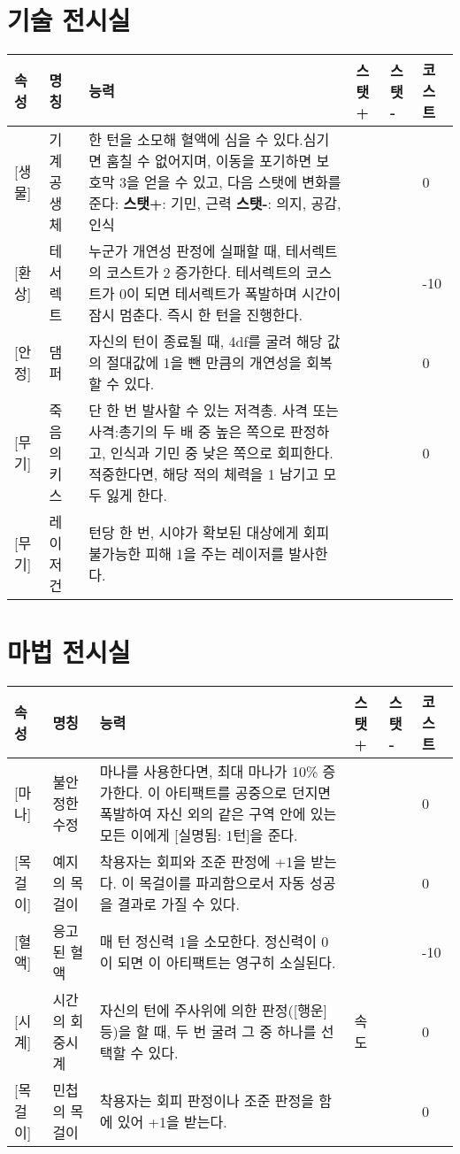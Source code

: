 \documentclass{report}
\begin{document}
	\section*{기술 전시실}
	\begin{tabularx}{\textwidth}{l|l|X|l|l|l}
		\textbf{속성} & \textbf{명칭} & \textbf{능력} & \textbf{스탯 +} & \textbf{스탯 -} & \textbf{코스트}\\ \hline \hline
		[기술][생물]& 기계 공생체 & 한 턴을 소모해 혈액에 심을 수 있다.\newline 심기면 훔칠 수 없어지며, 이동을 포기하면 보호막 3을 얻을 수 있고, 다음 스탯에 변화를 준다: \newline \textbf{스탯+}: 기민, 근력 \newline \textbf{스탯-}: 의지, 공감, 인식  &   &     & 0 \\ \hline
		[기술][환상]& 테서렉트 & 누군가 개연성 판정에 실패할 때, 테서렉트의 코스트가 2 증가한다. \newline 테서렉트의 코스트가 0이 되면 테서렉트가 폭발하며 시간이 잠시 멈춘다. 즉시 한 턴을 진행한다. &  &      & -10 \\ \hline
		[기술][안정]& 댐퍼 & 자신의 턴이 종료될 때, 4df를 굴려 해당 값의 절대값에 1을 뺀 만큼의 개연성을 회복할 수 있다.  &  &      & 0 \\ \hline
		[기술][무기]& 죽음의 키스 & 단 한 번 발사할 수 있는 저격총. 사격 또는 사격:총기의 두 배 중 높은 쪽으로 판정하고, 인식과 기민 중 낮은 쪽으로 회피한다. 적중한다면, 해당 적의 체력을 1 남기고 모두 잃게 한다.  &  &      & 0 \\ \hline
		[기술][무기]& 레이저 건 & 턴당 한 번, 시야가 확보된 대상에게 회피 불가능한 피해 1을 주는 레이저를 발사한다. &  & & \\
	\end{tabularx}
	
	\section*{마법 전시실}
	\begin{tabularx}{\textwidth}{l|l|X|l|l|l}
		\textbf{속성} & \textbf{명칭} & \textbf{능력} & \textbf{스탯 +} & \textbf{스탯 -} & \textbf{코스트} \\ \hline \hline
		[마법][마나]& 불안정한 수정 & 마나를 사용한다면, 최대 마나가 10\% 증가한다. 이 아티팩트를 공중으로 던지면 폭발하여 자신 외의 같은 구역 안에 있는 모든 이에게 [실명됨: 1턴]을 준다. &  & & 0 \\ \hline
		[마법][목걸이]& 예지의 목걸이 & 착용자는 회피와 조준 판정에 +1을 받는다. 이 목걸이를 파괴함으로서 자동 성공을 결과로 가질 수 있다. &  & & 0 \\ \hline
		[흑마법][혈액] & 응고된 혈액 & 매 턴 정신력 1을 소모한다. 정신력이 0이 되면 이 아티팩트는 영구히 소실된다. &  & & -10 \\ \hline
		[마법][시계] & 시간의 회중시계 & 자신의 턴에 주사위에 의한 판정([행운] 등)을 할 때, 두 번 굴려 그 중 하나를 선택할 수 있다.& 속도 & & 0 \\ \hline
		[마법][목걸이]& 민첩의 목걸이 & 착용자는 회피 판정이나 조준 판정을 함에 있어 +1을 받는다. &  & & 0 \\
	\end{tabularx}
	
\end{document}
